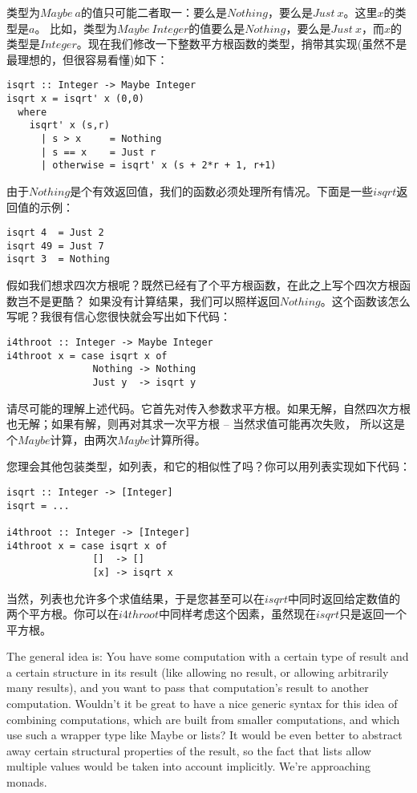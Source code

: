 类型为$Maybe\ a$的值只可能二者取一：要么是$Nothing$，要么是$Just\ x$。这里$x$的类型是$a$。 比如，类型为$Maybe\ Integer$的值要么是$Nothing$，要么是$Just\ x$，而$x$的类型是$Integer$。现在我们修改一下整数平方根函数的类型，捎带其实现(虽然不是最理想的，但很容易看懂)如下：

\begin{lstlisting}
isqrt :: Integer -> Maybe Integer
isqrt x = isqrt' x (0,0)
  where
    isqrt' x (s,r)
      | s > x     = Nothing
      | s == x    = Just r
      | otherwise = isqrt' x (s + 2*r + 1, r+1)
\end{lstlisting}

由于$Nothing$是个有效返回值，我们的函数必须处理所有情况。下面是一些$isqrt$返回值的示例：

\begin{lstlisting}
isqrt 4  = Just 2
isqrt 49 = Just 7
isqrt 3  = Nothing
\end{lstlisting}

假如我们想求四次方根呢？既然已经有了个平方根函数，在此之上写个四次方根函数岂不是更酷？ 如果没有计算结果，我们可以照样返回$Nothing$。这个函数该怎么写呢？我很有信心您很快就会写出如下代码：

\begin{lstlisting}
i4throot :: Integer -> Maybe Integer
i4throot x = case isqrt x of
               Nothing -> Nothing
               Just y  -> isqrt y
\end{lstlisting}

请尽可能的理解上述代码。它首先对传入参数求平方根。如果无解，自然四次方根也无解；如果有解，则再对其求一次平方根 -- 当然求值可能再次失败， 所以这是个$Maybe$计算，由两次$Maybe$计算所得。

您理会其他包装类型，如列表，和它的相似性了吗？你可以用列表实现如下代码：

\begin{lstlisting}
isqrt :: Integer -> [Integer]
isqrt = ...

i4throot :: Integer -> [Integer]
i4throot x = case isqrt x of
               []  -> []
               [x] -> isqrt x
\end{lstlisting}

当然，列表也允许多个求值结果，于是您甚至可以在$isqrt$中同时返回给定数值的两个平方根。你可以在$i4throot$中同样考虑这个因素，虽然现在$isqrt$只是返回一个平方根。

The general idea is: You have some computation with a certain type of result and a certain structure in its result (like allowing no result, or allowing arbitrarily many results), and you want to pass that computation's result to another computation. Wouldn't it be great to have a nice generic syntax for this idea of combining computations, which are built from smaller computations, and which use such a wrapper type like Maybe or lists? It would be even better to abstract away certain structural properties of the result, so the fact that lists allow multiple values would be taken into account implicitly. We're approaching monads. 

